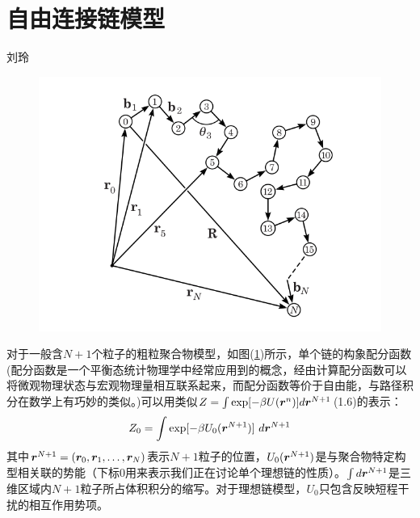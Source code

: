 \section{自由连接链模型}

\begin{center}
刘玲
\end{center}

\begin{figure}[H]
	\centering   
	\includegraphics[width=12cm]{Contents/chapter2/figures/2-1.png}
	\caption{ }
    \label{fig:2.1}
\end{figure}

对于一般含$N+1$个粒子的粗粒聚合物模型，如图(\ref{fig:2.1})所示，单个链的构象配分函数(配分函数是一个平衡态统计物理学中经常应用到的概念，经由计算配分函数可以将微观物理状态与宏观物理量相互联系起来，而配分函数等价于自由能，与路径积分在数学上有巧妙的类似。)可以用类似$Z=\int \exp[-\beta U(\bm{r}^{n})] d \bm{r}^{N+1}$(1.6)的表示：\\
\begin{equation}
Z_0 = \int \exp[-\beta U_{0}({\bm{r}}^{N+1})] ~d \bm{r}^{N+1}
\label{2.3}
\end{equation}
其中$\bm{r}^{N+1}=(\bm{r}_0,\bm{r}_1,\ldots,\bm{r}_{N})$表示$N+1$粒子的位置，$U_0(\bm{r}^{N+1})$是与聚合物特定构型相关联的势能（下标$0$用来表示我们正在讨论单个理想链的性质）。$\int d\bm{r}^{N+1}$是三维区域内$N+1$粒子所占体积积分的缩写。对于理想链模型，$U_0$只包含反映短程干扰的相互作用势项。\\

